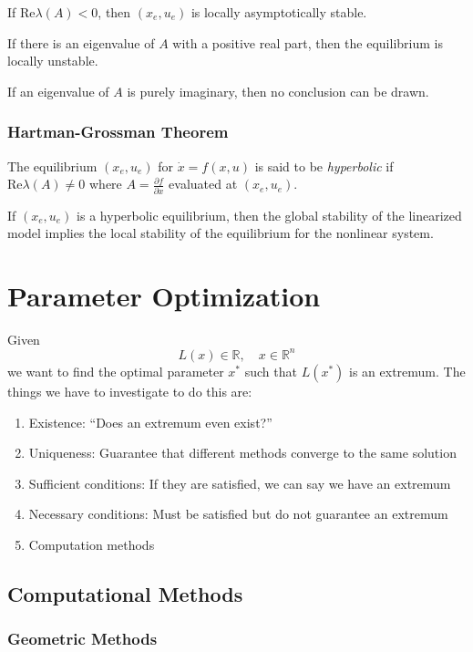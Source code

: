 \documentclass{article}
\begin{document}
\noindent
If $\text{Re}\lambda(A) < 0$, then $(x_e, u_e)$ is locally asymptotically stable.

\noindent
If there is an eigenvalue of $A$ with a positive real part, then the equilibrium is locally unstable.

\noindent
If an eigenvalue of $A$ is purely imaginary, then no conclusion can be drawn.

\subsubsection{Hartman-Grossman Theorem}

The equilibrium $(x_e, u_e)$ for $\dot{x} = f(x, u)$ is said to be \textit{hyperbolic}
if $\text{Re}\lambda(A) \ne 0$ where $A = \frac{\partial f}{\partial x}$ evaluated at $(x_e, u_e)$.

\begin{theorem}
    If $(x_e, u_e)$ is a hyperbolic equilibrium, then the global stability of the linearized model
    implies the local stability of the equilibrium for the nonlinear system.
\end{theorem}

\section{Parameter Optimization}

Given \[L(x) \in \mathbb{R}, \quad x \in \mathbb{R}^n\] we want to find
the optimal parameter $x^*$ such that $L(x^*)$ is an extremum. The things we have to investigate
to do this are:
\begin{enumerate}
    \item Existence: ``Does an extremum even exist?''
    \item Uniqueness: Guarantee that different methods converge to the same solution
    \item Sufficient conditions: If they are satisfied, we can say we have an extremum
    \item Necessary conditions: Must be satisfied but do not guarantee an extremum
    \item Computation methods
\end{enumerate}

\subsection{Computational Methods}

\subsubsection{Geometric Methods}
\end{document}
